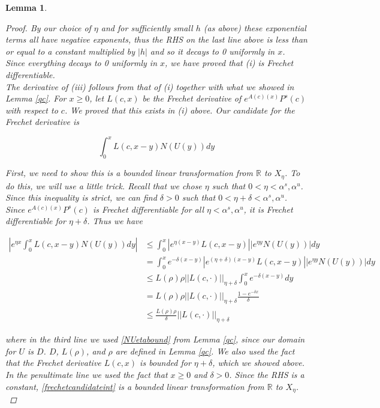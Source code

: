\documentclass[12pt]{article}
\def\R{{\mathbb R}}
\newtheorem{lemma}{Lemma}
\begin{document}
\begin{lemma}
\begin{proof}
By our choice of $\eta$ and for sufficiently small $h$ (as above) these exponential terms all have negative exponents, thus the RHS on the last line above is less than or equal to a constant multiplied by $|h|$ and so it decays to 0 uniformly in $x$.\\

Since everything decays to 0 uniformly in $x$, we have proved that (i) is Frechet differentiable.\\

The derivative of (iii) follows from that of (i) together with what we showed in Lemma \ref{qc}. For $x \geq 0$, let $L(c, x)$ be the Frechet derivative of $e^{A(c)(x)}P^s(c)$ with respect to $c$. We proved that this exists in (i) above. Our candidate for the Frechet derivative is

\begin{equation}\label{frechetcandidateint}
\int_0^x L(c, x - y) N(U(y)) dy
\end{equation}

First, we need to show this is a bounded linear transformation from $\R$ to $X_\eta$. To do this, we will use a little trick. Recall that we chose $\eta$ such that $0 < \eta < \alpha^s, \alpha^u$. Since this inequality is strict, we can find $\delta > 0$ such that $0 < \eta + \delta < \alpha^s, \alpha^u$. Since $e^{A(c)(x)}P^s(c)$ is Frechet differentiable for all $\eta < \alpha^s, \alpha^u$, it is Frechet differentiable for $\eta + \delta$. Thus we have

\begin{align*}
\left| e^{\eta x} \int_0^x L(c, x - y) N(U(y)) dy \right| &\leq \int_0^x |e^{\eta (x-y)} L(c, x - y)| |e^{\eta y} N(U(y))| dy\\
&= \int_0^x e^{-\delta (x-y)} |e^{(\eta + \delta) (x-y)} L(c, x - y)| |e^{\eta y} N(U(y))| dy\\
&\leq L(\rho)\rho ||L(c, \cdot) ||_{\eta + \delta} \int_0^x e^{-\delta(x-y)} dy\\
&= L(\rho)\rho ||L(c, \cdot) ||_{\eta + \delta} \frac{1 - e^{-\delta x}}{\delta}\\
&\leq \frac{L(\rho)\rho}{\delta}||L(c, \cdot) ||_{\eta + \delta}
\end{align*}

where in the third line we used \eqref{NUetabound} from Lemma \ref{qc}, since our domain for $U$ is $D$. $D$, $L(\rho)$, and $\rho$ are defined in Lemma \ref{qc}. We also used the fact that the Frechet derivative $L(c, x)$ is bounded for $\eta + \delta$, which we showed above. In the penultimate line we used the fact that $x \geq 0$ and $\delta > 0$. Since the RHS is a constant, \eqref{frechetcandidateint} is a bounded linear transformation from $\R$ to $X_\eta$.\\


\end{proof}
\end{lemma}
\end{document}
